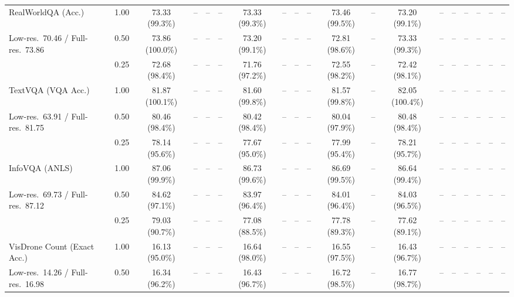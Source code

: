 \begin{table}[t]
{\begin{tabular}{l c | c c c c | c c c c | c c | c c c | c c c c}
\cmidrule(lr){1-19}
RealWorldQA (Acc.) & 1.00 & \cellcolor{gray!15}73.33 (99.3\%) & -- & -- & -- & \cellcolor{gray!15}73.33 (99.3\%) & -- & -- & -- & \cellcolor{gray!15}73.46 (99.5\%) & -- & \cellcolor{gray!15}73.20 (99.1\%) & -- & -- & -- & -- & -- & -- \\
{\footnotesize Low-res.\ 70.46 / Full-res.\ 73.86} & 0.50 & \cellcolor{gray!15}73.86 (100.0\%) & -- & -- & -- & \cellcolor{gray!15}73.20 (99.1\%) & -- & -- & -- & \cellcolor{gray!15}72.81 (98.6\%) & -- & \cellcolor{gray!15}73.33 (99.3\%) & -- & -- & -- & -- & -- & -- \\
 & 0.25 & \cellcolor{gray!15}72.68 (98.4\%) & -- & -- & -- & 71.76 (97.2\%) & -- & -- & -- & \cellcolor{gray!15}72.55 (98.2\%) & -- & \cellcolor{gray!15}72.42 (98.1\%) & -- & -- & -- & -- & -- & -- \\
\cmidrule(lr){1-19}
TextVQA (VQA Acc.) & 1.00 & \cellcolor{gray!15}81.87 (100.1\%) & -- & -- & -- & \cellcolor{gray!15}81.60 (99.8\%) & -- & -- & -- & \cellcolor{gray!15}81.57 (99.8\%) & -- & \cellcolor{gray!15}82.05 (100.4\%) & -- & -- & -- & -- & -- & -- \\
{\footnotesize Low-res.\ 63.91 / Full-res.\ 81.75} & 0.50 & \cellcolor{gray!15}80.46 (98.4\%) & -- & -- & -- & \cellcolor{gray!15}80.42 (98.4\%) & -- & -- & -- & 80.04 (97.9\%) & -- & \cellcolor{gray!15}80.48 (98.4\%) & -- & -- & -- & -- & -- & -- \\
 & 0.25 & 78.14 (95.6\%) & -- & -- & -- & 77.67 (95.0\%) & -- & -- & -- & 77.99 (95.4\%) & -- & 78.21 (95.7\%) & -- & -- & -- & -- & -- & -- \\
\cmidrule(lr){1-19}
InfoVQA (ANLS) & 1.00 & \cellcolor{gray!15}87.06 (99.9\%) & -- & -- & -- & \cellcolor{gray!15}86.73 (99.6\%) & -- & -- & -- & \cellcolor{gray!15}86.69 (99.5\%) & -- & \cellcolor{gray!15}86.64 (99.4\%) & -- & -- & -- & -- & -- & -- \\
{\footnotesize Low-res.\ 69.73 / Full-res.\ 87.12} & 0.50 & 84.62 (97.1\%) & -- & -- & -- & 83.97 (96.4\%) & -- & -- & -- & 84.01 (96.4\%) & -- & 84.03 (96.5\%) & -- & -- & -- & -- & -- & -- \\
 & 0.25 & 79.03 (90.7\%) & -- & -- & -- & 77.08 (88.5\%) & -- & -- & -- & 77.78 (89.3\%) & -- & 77.62 (89.1\%) & -- & -- & -- & -- & -- & -- \\
\cmidrule(lr){1-19}
VisDrone Count (Exact Acc.) & 1.00 & 16.13 (95.0\%) & -- & -- & -- & 16.64 (98.0\%) & -- & -- & -- & 16.55 (97.5\%) & -- & 16.43 (96.7\%) & -- & -- & -- & -- & -- & -- \\
{\footnotesize Low-res.\ 14.26 / Full-res.\ 16.98} & 0.50 & 16.34 (96.2\%) & -- & -- & -- & 16.43 (96.7\%) & -- & -- & -- & \cellcolor{gray!15}16.72 (98.5\%) & -- & \cellcolor{gray!15}16.77 (98.7\%) & -- & -- & -- & -- & -- & -- \\

\end{tabular}}
\end{table}
